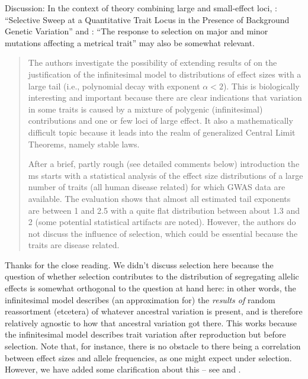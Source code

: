 
\begin{point}{}
    Discussion: In the context of theory combining large and small-effect loci, \citet{chevin2008selective}: ``Selective Sweep at a Quantitative Trait Locus in the Presence of Background Genetic Variation'' and \citet{lande1983response}: ``The response to selection on major and minor mutations affecting a metrical trait'' may also be somewhat relevant.
\end{point}



\begin{quote}
The authors investigate the possibility of extending results of \citet{barton2017infinitesimal} on the
justification of the infinitesimal model to distributions of effect sizes with a large tail (i.e.,
polynomial decay with exponent $\alpha < 2$). This is biologically interesting and important
because there are clear indications that variation in some traits is caused by a mixture
of polygenic (infinitesimal) contributions and one or few loci of large effect. It also a
mathematically difficult topic because it leads into the realm of generalized Central Limit
Theorems, namely stable laws.

After a brief, partly rough (see detailed comments below) introduction the ms starts with
a statistical analysis of the effect size distributions of a large number of traits (all human
disease related) for which GWAS data are available. The evaluation shows that almost
all estimated tail exponents are between 1 and 2.5 with a quite flat distribution between
about 1.3 and 2 (some potential statistical artifacts are noted). However, the authors do
not discuss the influence of selection, which could be essential because the traits are disease
related.
\end{quote}

Thanks for the close reading.
We didn't discuss selection here because the question of whether selection contributes
to the distribution of segregating allelic effects
is somewhat orthogonal to the question at hand here:
in other words, the infinitesimal model describes (an approximation for)
the \emph{results of} random reassortment (etcetera) of whatever ancestral variation is present,
and is therefore relatively agnostic to how that ancestral variation got there.
This works because the infinitesimal model describes trait variation after reproduction
but before selection.
Note that, for instance, there is no obstacle to there being a correlation between effect sizes and allele frequencies,
as one might expect under selection.
However, we have added some clarification about this --
see  and .

